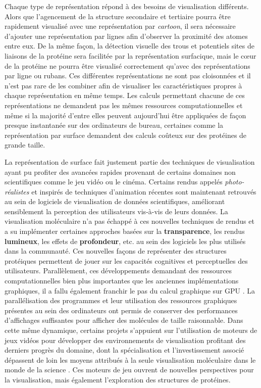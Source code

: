 Chaque type de représentation répond à des besoins de visualisation différents. Alors que l'agencement de la structure secondaire et tertiaire pourra être rapidement visualisé avec une représentation par \textit{cartoon}, il sera nécessaire d'ajouter une représentation par lignes afin d'observer la proximité des atomes entre eux. De la même façon, la détection visuelle des trous et potentiels sites de liaisons de la protéine sera facilitée par la représentation surfacique, mais le cœur de la protéine ne pourra être visualisé correctement qu'avec des représentations par ligne ou rubans. Ces différentes représentations ne sont pas cloisonnées et il n'est pas rare de les combiner afin de visualiser les caractéristiques propres à chaque représentation en même temps. Les calculs permettant chacune de ces représentations ne demandent pas les mêmes ressources computationnelles et même si la majorité d'entre elles peuvent aujourd'hui être appliquées de façon presque instantanée sur des ordinateurs de bureau, certaines comme la représentation par surface demandent des calculs coûteux sur des protéines de grande taille.

La représentation de surface fait justement partie des techniques de visualisation ayant pu profiter des avancées rapides provenant de certains domaines non scientifiques comme le jeu vidéo ou le cinéma. Certains rendus appelés \textit{photo-réalistes} et inspirés de techniques d'animation récentes sont maintenant retrouvés au sein de logiciels de visualisation de données scientifiques, améliorant sensiblement la perception des utilisateurs vis-à-vis de leurs données. La visualisation moléculaire n'a pas échappé à ces nouvelles techniques de rendus et a su implémenter certaines approches basées sur la \textbf{transparence}, les rendus \textbf{lumineux}, les effets de \textbf{profondeur}, etc. au sein des logiciels les plus utilisés dans la communauté. Ces nouvelles façons de représenter des structures protéiques permettent de jouer sur les capacités cognitives et perceptuelles des utilisateurs. Parallèlement, ces développements demandant des ressources computationnelles bien plus importantes que les anciennes implémentations graphiques, il a fallu également franchir le pas du calcul graphique sur GPU \cite{chavent_gpu-powered_2011}. La parallélisation des programmes et leur utilisation des ressources graphiques présentes au sein des ordinateurs ont permis de conserver des performances d'affichages suffisantes pour afficher des molécules de taille raisonnable. Dans cette même dynamique, certains projets s'appuient sur l'utilisation de moteurs de jeux vidéos pour développer des environnements de visualisation profitant des derniers progrès du domaine, dont la spécialisation et l'investissement associé dépassent de loin les moyens attribués à la seule visualisation moléculaire dans le monde de la science \cite{andrei2012intuitive,lv_game_2013}. Ces moteurs de jeu ouvrent de nouvelles perspectives pour la visualisation, mais également l'exploration des structures de protéines.

